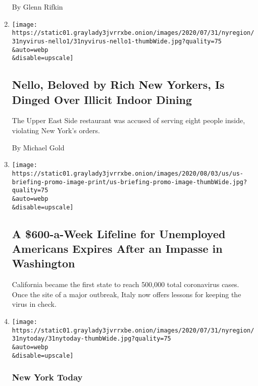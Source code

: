 \begin{enumerate}
  By Glenn Rifkin
\item
  \href{/2020/07/31/nyregion/nello-liquor-license-suspended.html}{}

  \texttt{[image: https://static01.graylady3jvrrxbe.onion/images/2020/07/31/nyregion/31nyvirus-nello1/31nyvirus-nello1-thumbWide.jpg?quality=75\\\&auto=webp\\\&disable=upscale]}

  \hypertarget{nello-beloved-by-rich-new-yorkers-is-dinged-over-illicit-indoor-dining}{%
  \subsection{Nello, Beloved by Rich New Yorkers, Is Dinged Over Illicit
  Indoor
  Dining}\label{nello-beloved-by-rich-new-yorkers-is-dinged-over-illicit-indoor-dining}}

  The Upper East Side restaurant was accused of serving eight people
  inside, violating New York's orders.

  By Michael Gold
\item
  \href{/2020/07/31/world/coronavirus-covid-19.html}{}

  \texttt{[image: https://static01.graylady3jvrrxbe.onion/images/2020/08/03/us/us-briefing-promo-image-print/us-briefing-promo-image-thumbWide.jpg?quality=75\\\&auto=webp\\\&disable=upscale]}

  \hypertarget{a-600-a-week-lifeline-for-unemployed-americans-expires-after-an-impasse-in-washington}{%
  \subsection{A \$600-a-Week Lifeline for Unemployed Americans Expires
  After an Impasse in
  Washington}\label{a-600-a-week-lifeline-for-unemployed-americans-expires-after-an-impasse-in-washington}}

  California became the first state to reach 500,000 total coronavirus
  cases. Once the site of a major outbreak, Italy now offers lessons for
  keeping the virus in check.
\item
  \href{/2020/07/31/nyregion/nyc-power-con-edison.html}{}

  \texttt{[image: https://static01.graylady3jvrrxbe.onion/images/2020/07/31/nyregion/31nytoday/31nytoday-thumbWide.jpg?quality=75\\\&auto=webp\\\&disable=upscale]}

  \hypertarget{new-york-today}{%
  \subsubsection{New York Today}\label{new-york-today}}


\end{enumerate}
